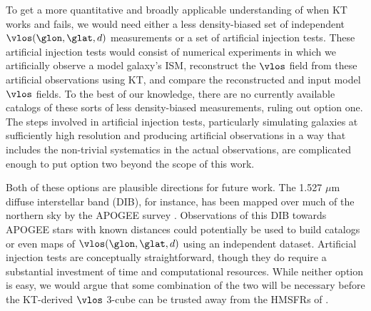 To get a more quantitative and broadly applicable understanding of when KT works and fails, we would need either a less density-biased set of independent $\vlos(\glon, \glat, d)$ measurements or a set of artificial injection tests. 
These artificial injection tests would consist of numerical experiments in which we artificially observe a model galaxy's ISM, reconstruct the $\vlos$ field from these artificial observations using KT, and compare the reconstructed and input model $\vlos$ fields. 
To the best of our knowledge, there are no currently available catalogs of these sorts of less density-biased measurements, ruling out option one.
The steps involved in artificial injection tests, particularly simulating galaxies at sufficiently high resolution and producing artificial observations in a way that includes the non-trivial systematics in the actual observations, are complicated enough to put option two beyond the scope of this work.

Both of these options are plausible directions for future work. 
The 1.527 $\mu$m diffuse interstellar band (DIB), for instance, has been mapped over much of the northern sky by the APOGEE survey \citep{2015ApJ...798...35Z}. 
Observations of this DIB towards APOGEE stars with known distances could potentially be used to build catalogs or even maps of $\vlos(\glon, \glat, d)$ using an independent dataset. 
Artificial injection tests are conceptually straightforward, though they do require a substantial investment of time and computational resources.
While neither option is easy, we would argue that some combination of the two will be necessary before the KT-derived $\vlos$ 3-cube can be trusted away from the HMSFRs of \Reid{}.
